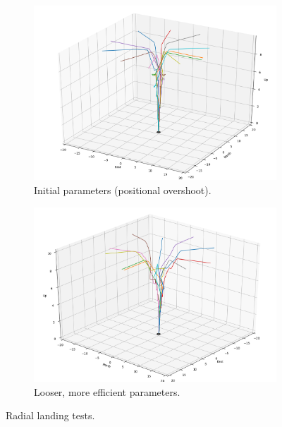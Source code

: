 \begin{figure}[ht]
    \centering
    \begin{subfigure}[b]{0.45\textwidth}
        \centering
        \includegraphics[width=\textwidth]{images/radial_land_test_initial.png}
        \caption{Initial parameters (positional overshoot).}
        \label{subfig:radial_land_test_initial}
    \end{subfigure}
    \begin{subfigure}[b]{0.45\textwidth}
        \centering
        \includegraphics[width=\textwidth]{images/radial_land_test_better.png}
        \caption{Looser, more efficient parameters.}
        \label{subfig:radial_land_test_better}
    \end{subfigure}
    \caption{Radial landing tests.}
    \label{fig:radial_land_test_better}
\end{figure}

